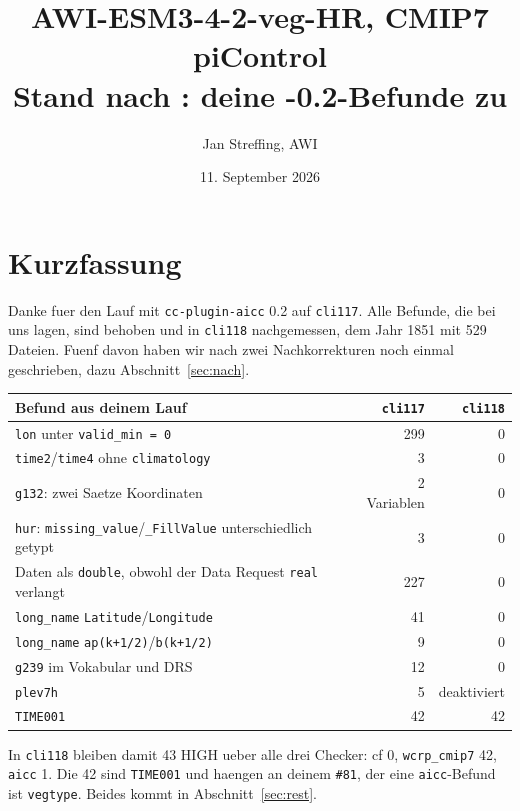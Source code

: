 \documentclass[11pt,a4paper]{article}
\title{AWI-ESM3-4-2-veg-HR, CMIP7 piControl\\[2mm]
\large Stand nach \code{cli118}: deine \code{aicc}-0.2-Befunde zu \code{cli117}}
\author{Jan Streffing, AWI}
\date{11. September 2026}
\newcommand{\code}[1]{\texttt{\small #1}}
\begin{document}
\maketitle

\section{Kurzfassung}

Danke fuer den Lauf mit \code{cc-plugin-aicc} 0.2 auf \code{cli117}. Alle
Befunde, die bei uns lagen, sind behoben und in \code{cli118} nachgemessen,
dem Jahr 1851 mit 529 Dateien. Fuenf davon haben wir nach zwei Nachkorrekturen
noch einmal geschrieben, dazu Abschnitt~\ref{sec:nach}.

\begin{center}
\begin{tabular}{lrr}
\toprule
\textbf{Befund aus deinem Lauf} & \textbf{\code{cli117}} & \textbf{\code{cli118}} \\
\midrule
\code{lon} unter \code{valid\_min = 0}               & 299 & 0 \\
\code{time2}/\code{time4} ohne \code{climatology}     &   3 & 0 \\
\code{g132}: zwei Saetze Koordinaten                  &   2 Variablen & 0 \\
\code{hur}: \code{missing\_value}/\code{\_FillValue} unterschiedlich getypt & 3 & 0 \\
Daten als \code{double}, obwohl der Data Request \code{real} verlangt & 227 & 0 \\
\code{long\_name} \code{Latitude}/\code{Longitude}   &  41 & 0 \\
\code{long\_name} \code{ap(k+1/2)}/\code{b(k+1/2)}   &   9 & 0 \\
\code{g239} im Vokabular und DRS                      &  12 & 0 \\
\code{plev7h}                                         &   5 & deaktiviert \\
\code{TIME001}                                        &  42 & 42 \\
\bottomrule
\end{tabular}
\end{center}

In \code{cli118} bleiben damit 43 HIGH ueber alle drei Checker: cf 0,
\code{wcrp\_cmip7} 42, \code{aicc} 1. Die 42 sind \code{TIME001} und haengen an
deinem \code{\#81}, der eine \code{aicc}-Befund ist \code{vegtype}. Beides kommt
in Abschnitt~\ref{sec:rest}.
\end{document}
